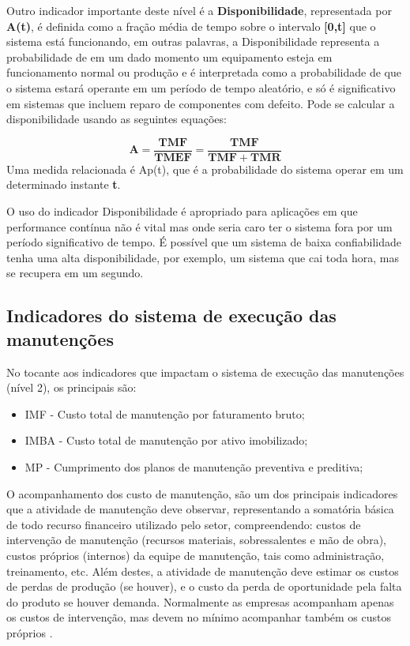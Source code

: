 Outro indicador importante deste nível é a \textbf{Disponibilidade}, representada por \textbf{A(t)}, é definida como a fração média de tempo sobre o intervalo \textbf{[0,t]} que o sistema está funcionando, em outras palavras, a Disponibilidade representa a probabilidade de em um dado momento um equipamento esteja em funcionamento normal ou produção e é interpretada como a probabilidade de que o sistema estará operante em um período de tempo aleatório, e só é significativo em sistemas que incluem reparo de componentes com defeito. Pode se calcular a disponibilidade usando as seguintes equações:

\begin{equation}
\label{eqn02}
	\mathbf{A} = \mathbf{\frac{TMF}{TMEF}} = \mathbf{\frac{TMF}{TMF + TMR}}
\end{equation}
Uma medida relacionada é Ap(t), que é a probabilidade do sistema operar em um determinado instante \textbf{t}.

O uso do indicador Disponibilidade é apropriado para aplicações em que performance contínua não é vital mas onde seria caro ter o sistema fora por um período significativo de tempo. É possível que um sistema de baixa confiabilidade tenha uma alta disponibilidade, por exemplo, um sistema que cai toda hora, mas se recupera em um segundo.

\subsection{Indicadores do sistema de execução das manutenções}
\label{nivel 2}

No tocante aos indicadores que impactam o sistema de execução das manutenções (nível 2), os principais são:

\begin{itemize}
	\item IMF - Custo total de manutenção por faturamento bruto;
	\item IMBA - Custo total de manutenção por ativo imobilizado;
	\item MP - Cumprimento dos planos de manutenção preventiva e preditiva;
	\end{itemize}

O acompanhamento dos custo de manutenção, são um dos principais indicadores que a atividade de manutenção deve observar, representando a somatória básica de todo recurso financeiro utilizado pelo setor, compreendendo: custos de intervenção de manutenção (recursos materiais, sobressalentes e mão de obra), custos próprios (internos) da equipe de manutenção, tais como administração, treinamento, etc. Além destes, a atividade de manutenção deve estimar os custos de perdas de produção (se houver), e o custo da perda de oportunidade pela falta do produto se houver demanda. Normalmente as empresas acompanham apenas os custos de intervenção, mas devem no mínimo acompanhar também os custos próprios \cite{ZEN2008}.

